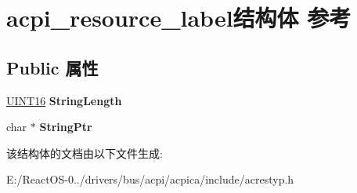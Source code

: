 \hypertarget{structacpi__resource__label}{}\section{acpi\+\_\+resource\+\_\+label结构体 参考}
\label{structacpi__resource__label}
\subsection*{Public 属性}
\begin{DoxyCompactItemize}
\item 
\mbox{\label{structacpi__resource__label_ab1263368c0e23164e889842c25e6daac}} 
\hyperlink{_processor_bind_8h_a09f1a1fb2293e33483cc8d44aefb1eb1}{U\+I\+N\+T16} {\bfseries String\+Length}
\item 
\mbox{\label{structacpi__resource__label_aa8c8d6b538c6fed1cc7c651496ebf583}} 
char $\ast$ {\bfseries String\+Ptr}
\end{DoxyCompactItemize}


该结构体的文档由以下文件生成\+:\begin{DoxyCompactItemize}
\item 
E\+:/\+React\+O\+S-\/0../drivers/bus/acpi/acpica/include/acrestyp.\+h\end{DoxyCompactItemize}
